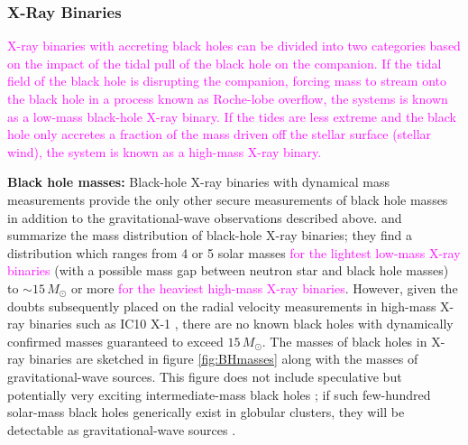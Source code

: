 \documentclass[iop,onecolumn]{revtex4}
\newcommand{\todo}[1]{\textcolor{red}{#1}}
\newcommand{\ilya}[1]{\textcolor{magenta}{#1}}
\begin{document}
\subsubsection{X-Ray Binaries}

\ilya{X-ray binaries with accreting black holes can be divided into two categories based on the impact of the tidal pull of the black hole on the companion.  If the tidal field of the black hole is disrupting the companion, forcing mass to stream onto the black hole in a process known as Roche-lobe overflow, the systems is known as a low-mass black-hole X-ray binary.  If the tides are less extreme and the black hole only accretes a fraction of the mass driven off the stellar surface (stellar wind), the system is known as a high-mass X-ray binary.}

\textbf{Black hole masses:} 
Black-hole X-ray binaries with dynamical mass measurements provide the only other secure measurements of black hole masses in addition to the gravitational-wave observations described above.  \citet{Ozel:2010} and \citet{Farr:2011} summarize the mass distribution of black-hole X-ray binaries; they find a distribution which ranges from 4 or 5 solar masses \ilya{for the lightest low-mass X-ray binaries} (with a possible mass gap between neutron star and black hole masses) to $\sim 15\, M_\odot$ or more \ilya{for the heaviest high-mass X-ray binaries}.  However, given the doubts subsequently placed on the radial velocity measurements in high-mass X-ray binaries such as IC10 X-1 \citep{Laycock:2015}, there are no known black holes with dynamically confirmed masses guaranteed to exceed $15\, M_\odot$.  The masses of black holes in X-ray binaries are sketched in figure \ref{fig:BHmasses} along with the masses of gravitational-wave sources.  This figure does not include speculative but potentially very exciting intermediate-mass black holes \citep{MillerColbert:2004,Pasham:2014}; if such few-hundred solar-mass black holes generically exist in globular clusters, they will be detectable as gravitational-wave sources \citep[e.g.,][]{Mandel:2008}.
\end{document}
